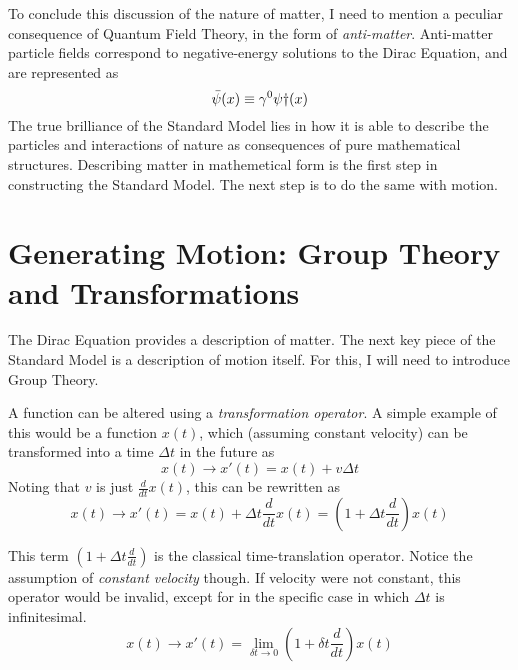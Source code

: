     To conclude this discussion of the nature of matter,
        I need to mention a peculiar consequence of Quantum Field Theory, in the form of \textit{anti-matter}.
    Anti-matter particle fields correspond to negative-energy solutions to the Dirac Equation,
        and are represented as
    \begin{equation}
        \bar{\psi}(x) \equiv \gamma^0 \psi\dag(x)
    \end{equation}
    The true brilliance of the Standard Model lies in how it is able to describe the particles and interactions of nature
        as consequences of pure mathematical structures.
    Describing matter in mathemetical form is the first step in constructing the Standard Model.
    The next step is to do the same with motion.


\section{Generating Motion: Group Theory and Transformations}

    The Dirac Equation provides a description of matter.
    The next key piece of the Standard Model is a description of motion itself.
    For this, I will need to introduce Group Theory.

    A function can be altered using a \textit{transformation operator}.
    A simple example of this would be a function $x(t)$, 
        which (assuming constant velocity) can be transformed into a time $\Delta t$ in the future as
    \begin{equation}
    x(t) \rightarrow x'(t) = x(t) + v \Delta t
    \end{equation}
    Noting that $v$ is just $\frac{d}{dt} x(t)$, this can be rewritten as
    \begin{equation}
    x(t) \rightarrow x'(t) = x(t) + \Delta t \frac{d}{dt} x(t) = \left(1+\Delta t \frac{d}{dt}\right) x(t)
    \end{equation}

    This term $\left(1+\Delta t \frac{d}{dt}\right)$ is the classical time-translation operator.
    Notice the assumption of \textit{constant velocity} though.
    If velocity were not constant, this operator would be invalid, except for in the specific case in which $\Delta t$ is infinitesimal.
    \begin{equation}
    x(t) \rightarrow x'(t) = \lim_{\delta t \to 0} \left(1+\delta t \frac{d}{dt}\right) x(t)
    \end{equation}

